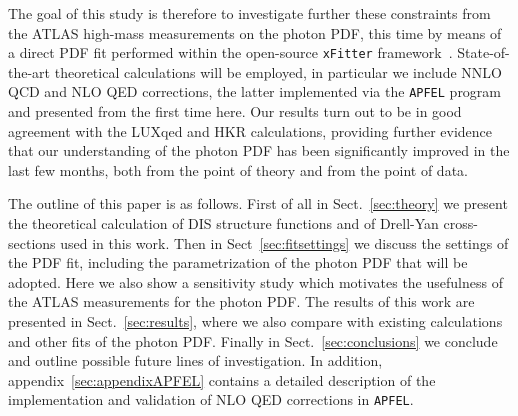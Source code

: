 The goal of this study is therefore to investigate further these constraints
from the ATLAS high-mass measurements on the photon PDF,
this time by means of a direct PDF fit performed within the
open-source {\tt xFitter} framework~\cite{Alekhin:2014irh}.
%
State-of-the-art theoretical calculations will be employed,
in particular
we include NNLO QCD and NLO QED corrections, the latter implemented
via the {\tt APFEL} program and presented from the first time
here.
%
Our results turn out to be in good agreement with the LUXqed and HKR
calculations, providing further evidence that our understanding
of the photon PDF has been significantly improved in the last
few months, both from the point of theory and from
the point of data.

The outline of this paper is as follows.
%
First of all in Sect.~\ref{sec:theory} we present the theoretical
calculation of DIS structure functions and of Drell-Yan cross-sections
used in this work.
%
Then in Sect~\ref{sec:fitsettings} we discuss the settings of
the PDF fit, including the parametrization of the photon PDF
that will be adopted.
%
Here we also show a sensitivity study which motivates the
usefulness of the ATLAS measurements for the photon PDF.
%
The results of this work are presented in Sect.~\ref{sec:results},
where we also compare with existing calculations and other
fits of the photon PDF.
%
Finally in Sect.~\ref{sec:conclusions} we conclude
and outline possible future lines of investigation.
%
In addition, appendix~\ref{sec:appendixAPFEL} contains a detailed description of
the implementation and validation of NLO QED corrections
in {\tt APFEL}.
